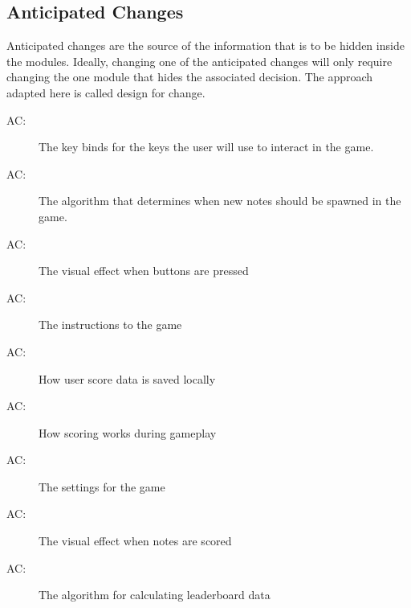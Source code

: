 \documentclass[12pt, titlepage]{article}
\newcounter{acnum}
\newcommand{\actheacnum}{AC\theacnum}
\begin{document}
\begin{comment}
\section{Anticipated and Unlikely Changes} \label{SecChange}
This section lists possible changes to the system. According to the likeliness
of the change, the possible changes are classified into two
categories. Anticipated changes are listed in Section \ref{SecAchange}, and
unlikely changes are listed in Section \ref{SecUchange}.
\end{comment}

\subsection{Anticipated Changes} \label{SecAchange}

Anticipated changes are the source of the information that is to be hidden
inside the modules. Ideally, changing one of the anticipated changes will only
require changing the one module that hides the associated decision. The approach
adapted here is called design for
change.

\begin{description}
\item[ \actheacnum \label{ac1}:] The key binds for the keys the user will use to interact in the game.
\item[ \actheacnum \label{ac2}:] The algorithm that determines when new notes should be spawned in the game.
\item[ \actheacnum \label{ac3}:] The visual effect when buttons are pressed
\item[ \actheacnum \label{ac4}:] The instructions to the game
\item[ \actheacnum \label{ac5}:] How user score data is saved locally
\item[ \actheacnum \label{ac6}:] How scoring works during gameplay
\item[ \actheacnum \label{ac7}:] The settings for the game
\item[ \actheacnum \label{ac8}:] The visual effect when notes are scored
\item[ \actheacnum \label{ac9}:] The algorithm for calculating leaderboard data

\end{description}
\end{document}
